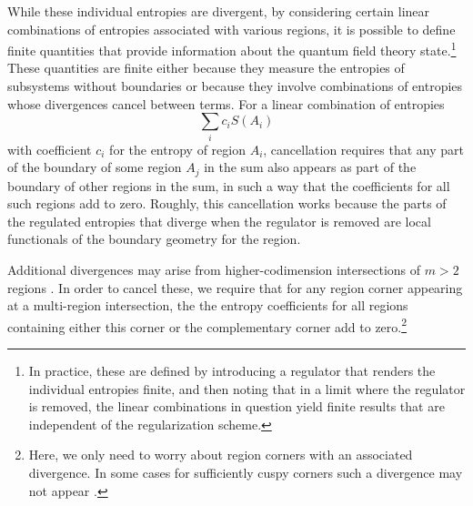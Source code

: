 \documentclass[12pt]{article}
\theoremstyle{definition}
\begin{document}
While these individual entropies are divergent, by considering certain linear combinations of entropies associated with various regions, it is possible to define finite quantities that provide information about the quantum field theory state.\footnote{In practice, these are defined by introducing a regulator that renders the individual entropies finite, and then noting that in a limit where the regulator is removed, the linear combinations in question yield finite results that are independent of the regularization scheme.} These quantities are finite either because they measure the entropies of subsystems without boundaries or because they involve combinations of entropies whose divergences cancel between terms. For a linear combination of entropies 
\begin{equation}
\label{entsum}
\sum_i c_i S(A_i)
\end{equation}
with coefficient $c_i$ for the entropy of region $A_i$, cancellation requires that any part of the boundary of some region $A_j$ in the sum also appears as part of the boundary of other regions in the sum, in such a way that the coefficients for all such regions add to zero. Roughly, this cancellation works because the parts of the regulated entropies that diverge when the regulator is removed are local functionals of the boundary geometry for the region.

Additional divergences may arise from higher-codimension intersections of $m>2$ regions \cite{CasiniHuerta2007_Universal2p1,CasiniHuerta2009_Review,BuenoMyersWitczak2015_PRL,BuenoMyers2015_JHEP,BuenoMyersWitczak2015_Twist,KallinEtAl2014_JStatMech,StoudenmireEtAl2014_PRB,HaywardSierensEtAl2017_TrihedralPRB,BednikEtAl2019_TrihedralPRB,SeminaraSistiTonni2017_BCFT,Berthiere2019_BoundaryCornerPRB,Nishioka2018_RMP}. In order to cancel these, we require that for any region corner appearing at a multi-region intersection, the the entropy coefficients for all regions containing either this corner or the complementary corner add to zero.\footnote{Here, we only need to worry about region corners with an associated divergence. In some cases for sufficiently cuspy corners such a divergence may not appear \cite{BuenoCasiniWitczak2019_SingularJHEP}.}
\end{document}
